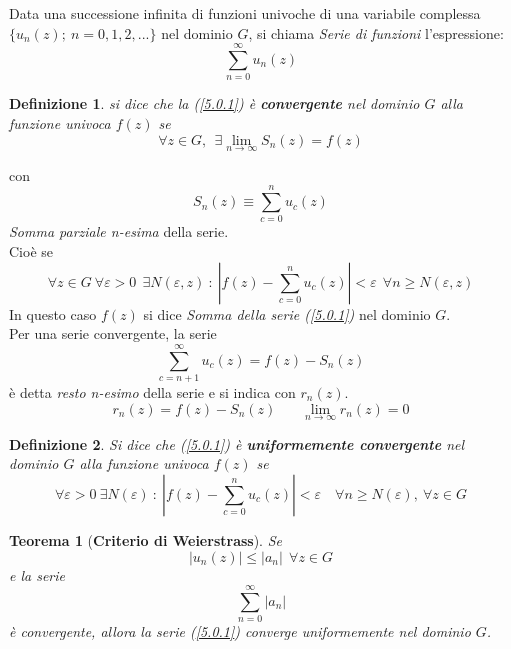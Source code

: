 \documentclass[twoside]{article}
\newtheorem{definition}{Definizione}[section]
\newtheorem{theorem}{Teorema}[section]
\begin{document}
Data una successione infinita di funzioni univoche di una variabile complessa $\{u_n(z) ; \ n=0,1,2,...\}$ nel dominio $G$, si chiama \textit{Serie di funzioni} l'espressione:
\begin{equation} \label{5.0.1}
    \sum_{n=0}^{\infty}u_n(z)
\end{equation}
\begin{definition} si dice che la (\ref{5.0.1}) è \textbf{convergente} nel dominio $G$ alla funzione univoca $f(z)$ se
\begin{equation}
    \forall z \in G, \ \ \exists \lim_{n \to \infty} S_n(z)=f(z)
\end{equation}
\end{definition}
con
\begin{equation}
    S_n(z)\equiv \sum_{c=0}^{n}u_c(z)
\end{equation}
\textit{Somma parziale n-esima} della serie.
\\
Cioè se
\begin{equation}
    \forall z \in G \ \forall \varepsilon >0 \ \ \exists N(\varepsilon,z) \ : \ \left|f(z)-\sum_{c=0}^n u_c(z)\right|<\varepsilon \ \ \forall n\geq N(\varepsilon,z)
\end{equation}
In questo caso $f(z)$ si dice \textit{Somma della serie (\ref{5.0.1})} nel dominio $G$.
\\
Per una serie convergente, la serie 
\begin{equation}
    \sum_{c=n+1}^{\infty} u_c(z)=f(z)-S_n(z)
\end{equation}
è detta \textit{resto n-esimo} della serie e si indica con $r_n(z)$.
\begin{equation}
    r_n(z)=f(z)-S_n(z) \ \ \ \ \ \ \ \ \lim_{n \to \infty} r_n(z)=0
\end{equation}
\begin{definition} Si dice che (\ref{5.0.1}) è \textbf{uniformemente convergente} nel dominio $G$ alla funzione univoca $f(z)$ se
\begin{equation}
    \forall \varepsilon >0 \ \exists N(\varepsilon) \ : \ \left|f(z)-\sum_{c=0}^n u_c(z)\right|< \varepsilon \quad \forall n \geq N(\varepsilon), \ \forall z \in G
\end{equation}
\end{definition}
\begin{theorem}[\textbf{Criterio di Weierstrass}] \label{Weierstrass}
Se 
\begin{equation}
  |u_n(z)|\leq |a_n| \ \ \forall z \in G  
\end{equation}
 e la serie 
 \begin{equation} \label{5.0.9}
   \sum_{n=0}^{\infty} |a_n|  
 \end{equation}
  è convergente, allora la serie (\ref{5.0.1}) converge uniformemente nel dominio $G$.
\end{theorem}
\end{document}
